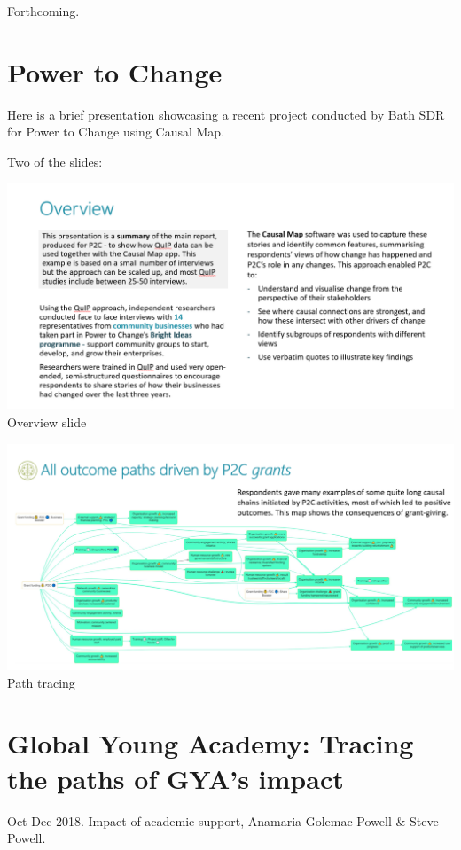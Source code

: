 \documentclass[
]{book}
\begin{document}
Forthcoming.

\hypertarget{power-to-change}{%
\section{Power to Change}\label{power-to-change}}

\href{https://drive.google.com/file/d/18OIi1FzLR3YX9FWiSEkqKnNDJyKQXX78/view}{Here} is a brief presentation showcasing a recent project conducted by Bath SDR for Power to Change using Causal Map.

Two of the slides:

\includegraphics{_assets/de1f66536036d0c064f913bf0cabe84e.png}
Overview slide

\includegraphics{_assets/ffd477406e03440d64bb63d5ca315b93.png}
Path tracing

\hypertarget{global-young-academy-tracing-the-paths-of-gyas-impact}{%
\section{Global Young Academy: Tracing the paths of GYA's impact}\label{global-young-academy-tracing-the-paths-of-gyas-impact}}

Oct-Dec 2018. Impact of academic support, Anamaria Golemac Powell \& Steve Powell.
\end{document}
